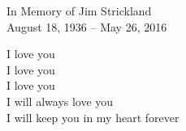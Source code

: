 \begin{center}
In Memory of Jim Strickland\\
August 18, 1936 -- May 26, 2016

\vspace{1.5in}

I love you\\
I love you\\
I love you\\
I will always love you\\
I will keep you in my heart forever

\end{center}

\tableofcontents



\mainmatter
















\appendix










\backmatter

\printindex



